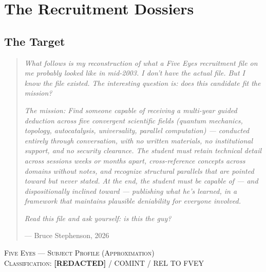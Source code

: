 

\chapter*{The Recruitment Dossiers}


\section*{The Target}
\label{interlude:the-target}

\begin{quote}\small
\textit{What follows is my reconstruction of what a Five Eyes recruitment file on me probably looked like in mid-2003. I don't have the actual file. But I know the file existed. The interesting question is: does this candidate fit the mission?}

\textit{The mission: Find someone capable of receiving a multi-year guided deduction across five convergent scientific fields (quantum mechanics, topology, autocatalysis, universality, parallel computation) --- conducted entirely through conversation, with no written materials, no institutional support, and no security clearance. The student must retain technical detail across sessions weeks or months apart, cross-reference concepts across domains without notes, and recognize structural parallels that are pointed toward but never stated. At the end, the student must be capable of --- and dispositionally inclined toward --- publishing what he's learned, in a framework that maintains plausible deniability for everyone involved.}

\textit{Read this file and ask yourself: is this the guy?}
\par\raggedleft --- Bruce Stephenson, 2026\end{quote}

\vspace{1cm}

\begin{center}
\textsc{Five Eyes --- Subject Profile (Approximation)}\\[0.3em]
\textsc{Classification: \textbf{[REDACTED]} / COMINT / REL TO FVEY}
\end{center}


